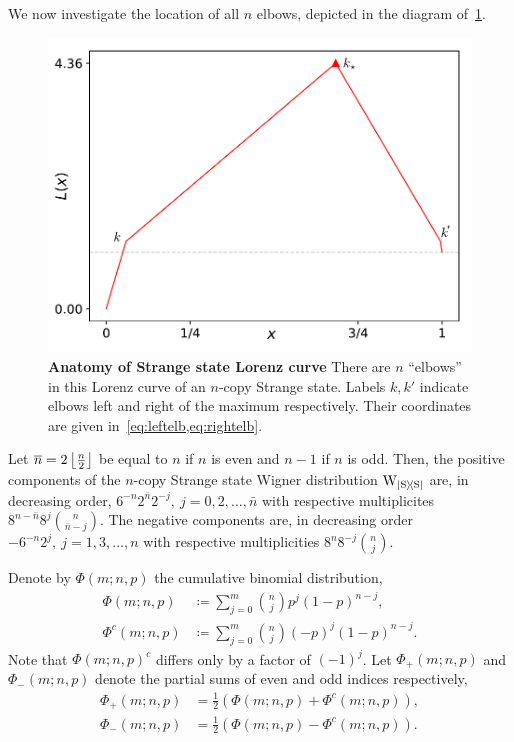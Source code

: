 \documentclass[pra,
aps,
twocolumn,
superscriptaddress,
groupedaddress,
nofootinbib,
reprint
]{revtex4-1}
\begin{document}
We now investigate the location of all $n$ elbows, depicted in the diagram of~\cref{fig:lccalc}.

\begin{figure}
    \centering
    \includegraphics[scale=0.5]{figs/lccalcdiagram.pdf}
    \caption{\textbf{Anatomy of Strange state Lorenz curve}
    There are $n$ ``elbows'' in this Lorenz curve of an $n$-copy Strange state.
    Labels $k, k'$ indicate elbows left and right of the maximum respectively.
    Their coordinates are given in~\cref{eq:leftelb,eq:rightelb}.
    }
    \label{fig:lccalc}
\end{figure}

Let $\overline{n} = 2\left\lfloor \frac{n}{2} \right\rfloor$ be equal to $n$ if $n$ is even and $n-1$ if $n$ is odd.
Then, the positive components of the $n$-copy Strange state Wigner distribution $\W{\ketbra{\rm{S}}}$ are, in decreasing order, $6^{-n} 2^{\bar n} 2^{-j},\ j=0, 2, \dots, \bar n$ with respective multiplicites $8^{n-\bar n} 8^j \binom{n}{\bar n - j}$.
The negative components are, in decreasing order $-6^{-n} 2^j,\ j=1,3, \dots, n$ with respective multiplicities $8^n 8^{-j} \binom{n}{j}$.

Denote by $\Phi(m; n, p)$ the cumulative binomial distribution,
\begin{align}
	\Phi(m; n, p) &\coloneqq \sum\limits_{j=0}^m \binom{n}{j} p^j (1-p)^{n-j}, \\
	\Phi^c(m; n, p) &\coloneqq \sum\limits_{j=0}^m \binom{n}{j} (-p)^j (1-p)^{n-j}.
\end{align}
Note that $\Phi(m; n, p)^c$ differs only by a factor of $(-1)^j$.
Let $\Phi_+(m; n, p)$ and $\Phi_-(m; n, p)$ denote the partial sums of even and odd indices respectively,
\begin{align}	
	\Phi_+(m; n, p) &= \frac{1}{2} \left( \Phi(m; n, p) + \Phi^c(m; n, p) \right), \\
	\Phi_-(m; n, p) &= \frac{1}{2} \left( \Phi(m; n, p) - \Phi^c(m; n, p) \right).
\end{align}
\end{document}
